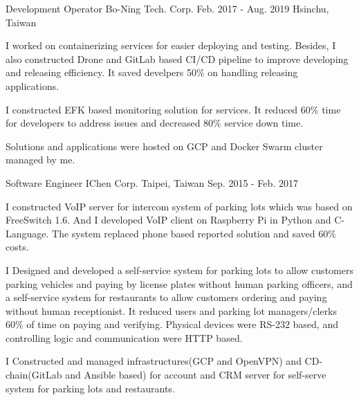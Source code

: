 \begin{cventries}
    \cventry
        {Development Operator}
        {Bo-Ning Tech. Corp.}
        {Feb. 2017 - Aug. 2019}
        {Hsinchu, Taiwan}
        {
            \begin{cvitems}
                \item
                    {
                        I worked on containerizing services for easier deploying and testing. Besides, I also constructed Drone and GitLab based  CI/CD pipeline to improve developing and releasing efficiency. It saved develpers 50\% on handling releasing applications.
                    }
                \item
                    {
                        I constructed EFK based monitoring solution for services. It reduced 60\% time for developers to address issues and decreased 80\% service down time.
                    }
                \item
                    {
                        Solutions and applications were hosted on GCP and Docker Swarm cluster managed by me.
                    }
            \end{cvitems}
        }

    \cventry
        {Software Engineer}
        {IChen Corp.}
        {Taipei, Taiwan}
        {Sep. 2015 - Feb. 2017}
        {
            \begin{cvitems}
                \item
                    {
                        I constructed VoIP server for intercom system of parking lots which was based on FreeSwitch 1.6. And I developed VoIP client on Raspberry Pi in Python and C-Language. The system replaced phone based reported solution and saved 60\% costs.
                    }
                \item
                    {
                        I Designed and developed a self-service system for parking lots to allow customers parking vehicles and paying by license plates without human parking officers, and a self-service system for restaurants to allow customers ordering and paying without human receptionist. It reduced users and parking lot managers/clerks 60\% of time on paying and verifying. Physical devices were RS-232 based, and controlling logic and communication were HTTP based. 
                    }
                \item
                    {
                        I Constructed and managed infrastructures(GCP and OpenVPN) and CD-chain(GitLab and Ansible based) for account and CRM server for self-serve system for parking lots and restaurants.
                    }
            \end{cvitems}
        }

\end{cventries}
